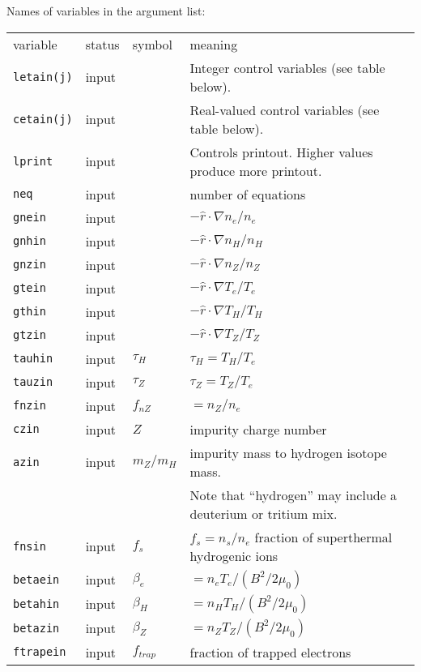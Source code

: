 \begin{center}
Names of variables in the argument list:
\begin{tabular}{lllp{3.0in}}
variable & status & symbol & meaning \\
{\tt letain(j)} & input & & Integer control variables
                            (see table below).\\
{\tt cetain(j)} & input & & Real-valued control variables
                            (see table below).\\
{\tt lprint}    & input & & Controls printout.
 Higher values produce more printout. \\
{\tt neq} & input & & number of equations \\
{\tt gnein} & input & $  $
    & $ - \hat{r} \cdot \nabla n_e / n_e $ \\
{\tt gnhin} & input & $  $
    & $ - \hat{r} \cdot \nabla n_H / n_H $ \\
{\tt gnzin} & input & $  $
    & $ - \hat{r} \cdot \nabla n_Z / n_Z $ \\
{\tt gtein} & input & $  $
    & $ - \hat{r} \cdot \nabla T_e / T_e $ \\
{\tt gthin} & input & $  $
    & $ - \hat{r} \cdot \nabla T_H / T_H $ \\
{\tt gtzin} & input & $  $
    & $ - \hat{r} \cdot \nabla T_Z / T_Z $ \\
{\tt tauhin} & input & $\tau_H$ & $ \tau_H = T_H / T_e $ \\
{\tt tauzin} & input & $\tau_Z$ & $ \tau_Z = T_Z / T_e $ \\
{\tt fnzin} & input & $ f_{nZ} $ & $ = n_Z / n_e $ \\
{\tt czin}  & input & $ Z $ & impurity charge number \\
{\tt azin}  & input & $ m_Z / m_H $
     & impurity mass to hydrogen isotope mass. \\
 & & & Note that ``hydrogen'' may include a deuterium or tritium mix. \\
{\tt fnsin}  & input & $ f_s $
  & $ f_s = n_s / n_e $ fraction of superthermal hydrogenic ions \\
{\tt betaein} & input & $\beta_e$ &
     $ = n_e T_e / ( B^2 / 2 \mu_0 ) $ \\
{\tt betahin} & input & $\beta_H$ &
     $ = n_H T_H / ( B^2 / 2 \mu_0 ) $ \\
{\tt betazin} & input & $\beta_Z$ &
     $ = n_Z T_Z / ( B^2 / 2 \mu_0 ) $ \\
{\tt ftrapein}  & input & $f_{trap} $ &
    fraction of trapped electrons \\

\end{tabular}
\end{center}
